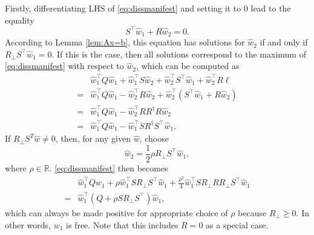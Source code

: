 \documentclass[11pt,print,draftcls,onecolumn,romanappendices]{ieeecolor}
\newcommand{\R}{\mathbb{R}}
\begin{document}
\noindent Firstly, differentiating LHS of \eqref{eq:dissmanifest} and setting it to 0 lead to the equality
\begin{equation*}\label{eq:max}
	S^\top \hat{w}_1+R\hat{w}_2=0.
\end{equation*}
According to Lemma \ref{lem:Ax=b}, this equation has solutions for $\hat{w}_2$ if and only if $R_\perp S^\top\hat{w}_1=0$. If this is the case, then all solutions correspond to the maximum of \eqref{eq:dissmanifest} with respect to $\hat{w}_2$, which can be computed as
\begin{equation}
	\begin{split}
		&\hat{w}_1^\top Q\hat{w}_1+\hat{w}_1^\top S\hat{w}_2+\hat{w}_2^\top S^\top \hat{w}_1+\hat{w}_2^\top R\ell\\
		=&\hat{w}_1^\top Q\hat{w}_1-\hat{w}_2^\top R\hat{w}_2+\hat{w}_2^\top (S^\top \hat{w}_1+R\hat{w}_2)\\
		=&\hat{w}_1^\top Q\hat{w}_1-\hat{w}_2^\top RR^{\dagger} R\hat{w}_2\\
		=&\hat{w}_1^\top Q\hat{w}_1-\hat{w}_1^\top SR^{\dagger} S^\top \hat{w}_1.
	\end{split}
\end{equation}
If $R_\perp S^T\hat{w}\neq0$, then, for any given $\hat{w}$, choose
\begin{equation}
	\hat{w}_2=\frac{1}{2}\rho R_\perp S^\top\hat{w}_1,
\end{equation}
where $\rho\in\R$. \eqref{eq:dissmanifest} then becomes
\begin{equation*}
	\begin{split}
		&\hat{w}_1^\top Q\hat{w}_1+\rho\hat{w}_1^\top S R_\perp S^\top\hat{w}_1+\frac{\rho^2}{4}\hat{w}_1^\top SR_\perp RR_\perp S^\top\hat{w}_1\\
		=&\hat{w}_1^\top (Q+\rho S R_\perp S^\top)\hat{w}_1,
	\end{split}
\end{equation*}
which can always be made positive for appropriate choice of $\rho$ because $R_\perp\geq0$. In other words, $w_1$ is free. Note that this includes $R=0$ as a special case.

%
\end{document}
